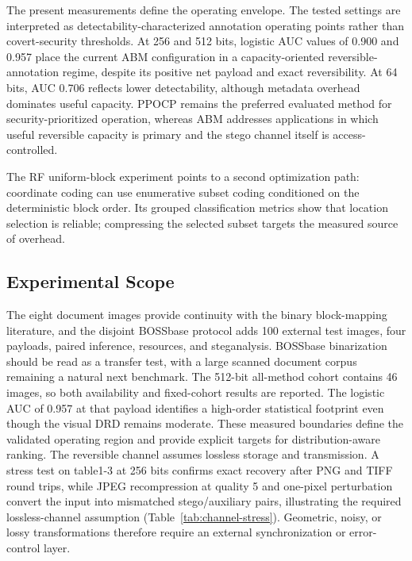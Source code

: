 \documentclass[a4paper,fleqn]{cas-dc}
\begin{document}
The present measurements define the operating envelope. The tested settings
are interpreted as detectability-characterized annotation operating points
rather than covert-security thresholds. At 256 and 512 bits, logistic AUC
values of 0.900 and 0.957 place the current ABM configuration in a
capacity-oriented reversible-annotation regime, despite its positive net
payload and exact reversibility. At 64 bits, AUC 0.706 reflects lower
detectability, although metadata overhead dominates useful capacity. PPOCP remains the
preferred evaluated method for security-prioritized operation, whereas ABM
addresses applications in which useful reversible capacity is primary and
the stego channel itself is access-controlled.

The RF uniform-block experiment points to a second optimization path:
coordinate coding can use enumerative subset coding conditioned on the
deterministic block order. Its grouped classification metrics show that
location selection is reliable; compressing the selected subset targets the
measured source of overhead.

\subsection{Experimental Scope}
\label{subsec:scope}

The eight document images provide continuity with the binary block-mapping
literature, and the disjoint BOSSbase protocol adds 100 external test images,
four payloads, paired inference, resources, and steganalysis. BOSSbase
binarization should be read as a transfer test, with a large scanned document
corpus remaining a natural next benchmark. The 512-bit all-method cohort
contains 46 images, so both
availability and fixed-cohort results are reported. The logistic AUC of 0.957
at that payload identifies a high-order statistical footprint even though the
visual DRD remains moderate. These measured boundaries define the validated
operating region and provide explicit targets for distribution-aware ranking.
The reversible channel assumes lossless storage and transmission. A stress test
on table1-3 at 256 bits confirms exact recovery after PNG and TIFF round trips,
while JPEG recompression at quality 5 and one-pixel perturbation convert the
input into mismatched stego/auxiliary pairs, illustrating the required
lossless-channel assumption (Table~\ref{tab:channel-stress}). Geometric,
noisy, or lossy transformations therefore require an external synchronization
or error-control layer.
\end{document}
